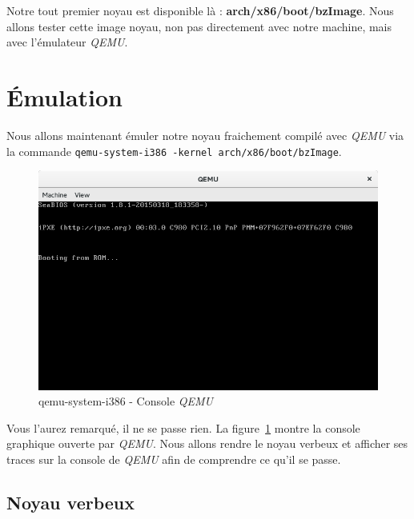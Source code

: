 \documentclass[a4paper]{article}
\begin{document}
Notre tout premier noyau est disponible là : \textbf{arch/x86/boot/bzImage}. Nous allons tester cette image noyau, non pas directement avec notre machine, mais avec l'émulateur \textit{QEMU}.

\clearpage
\section{Émulation}

Nous allons maintenant émuler notre noyau fraichement compilé avec \textit{QEMU} via la commande \lstset{language=sh}\lstinline{qemu-system-i386 -kernel arch/x86/boot/bzImage}.\\

\begin{figure}
\label{fig:qemu_first_run}
\includegraphics[scale=0.5]{../res/qemu-first-run.png}
\caption{qemu-system-i386 - Console \textit{QEMU}}
\end{figure}

Vous l'aurez remarqué, il ne se passe rien. La figure~\ref{fig:qemu_first_run} montre la console graphique ouverte par \textit{QEMU}. Nous allons rendre le noyau verbeux et afficher ses traces sur la console de \textit{QEMU} afin de comprendre ce qu'il se passe.

\subsection{Noyau verbeux}
\end{document}
